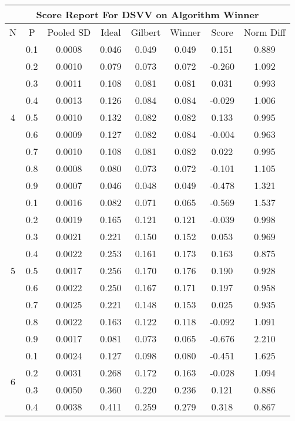 \documentclass[11pt,a4paper]{report}
\begin{document}
\begin{longtable}{ | c | c || c | c | c | c | c | c | }
\hline
\multicolumn{8}{|c|}{ Score Report For DSVV on Algorithm Winner} \\
\hline
N & P & Pooled SD &  Ideal &  Gilbert & Winner  & Score & Norm Diff \\
 \hline
 \hline
 \endhead
\multirow{9}{*}{4} & 0.1 & 0.0008 & 0.046 & 0.049 & 0.049 & 0.151 & 0.889 \\
 & 0.2 & 0.0010 & 0.079 & 0.073 & 0.072 & -0.260 & 1.092 \\
 & 0.3 & 0.0011 & 0.108 & 0.081 & 0.081 & 0.031 & 0.993 \\
 & 0.4 & 0.0013 & 0.126 & 0.084 & 0.084 & -0.029 & 1.006 \\
 & 0.5 & 0.0010 & 0.132 & 0.082 & 0.082 & 0.133 & 0.995 \\
 & 0.6 & 0.0009 & 0.127 & 0.082 & 0.084 & -0.004 & 0.963 \\
 & 0.7 & 0.0010 & 0.108 & 0.081 & 0.082 & 0.022 & 0.995 \\
 & 0.8 & 0.0008 & 0.080 & 0.073 & 0.072 & -0.101 & 1.105 \\
 & 0.9 & 0.0007 & 0.046 & 0.048 & 0.049 & -0.478 & 1.321 \\
 \hline
\multirow{9}{*}{5} & 0.1 & 0.0016 & 0.082 & 0.071 & 0.065 & -0.569 & 1.537 \\
 & 0.2 & 0.0019 & 0.165 & 0.121 & 0.121 & -0.039 & 0.998 \\
 & 0.3 & 0.0021 & 0.221 & 0.150 & 0.152 & 0.053 & 0.969 \\
 & 0.4 & 0.0022 & 0.253 & 0.161 & 0.173 & 0.163 & 0.875 \\
 & 0.5 & 0.0017 & 0.256 & 0.170 & 0.176 & 0.190 & 0.928 \\
 & 0.6 & 0.0022 & 0.250 & 0.167 & 0.171 & 0.197 & 0.958 \\
 & 0.7 & 0.0025 & 0.221 & 0.148 & 0.153 & 0.025 & 0.935 \\
 & 0.8 & 0.0022 & 0.163 & 0.122 & 0.118 & -0.092 & 1.091 \\
 & 0.9 & 0.0017 & 0.081 & 0.073 & 0.065 & -0.676 & 2.210 \\
 \hline
\multirow{9}{*}{6} & 0.1 & 0.0024 & 0.127 & 0.098 & 0.080 & -0.451 & 1.625 \\
 & 0.2 & 0.0031 & 0.268 & 0.172 & 0.163 & -0.028 & 1.094 \\
 & 0.3 & 0.0050 & 0.360 & 0.220 & 0.236 & 0.121 & 0.886 \\
 & 0.4 & 0.0038 & 0.411 & 0.259 & 0.279 & 0.318 & 0.867 \\

\end{longtable}
\end{document}
